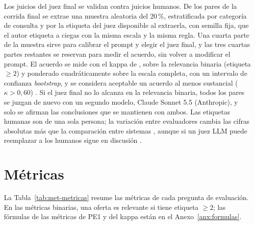 Los juicios del juez final se validan contra juicios humanos. De los pares de la corrida final se extrae una muestra aleatoria del 20\,\%, estratificada por categoría de consulta y por la etiqueta del juez disponible al extraerla, con semilla fija, que el autor etiqueta a ciegas con la misma escala y la misma regla. Una cuarta parte de la muestra sirve para calibrar el prompt y elegir el juez final, y las tres cuartas partes restantes se reservan para medir el acuerdo, sin volver a modificar el prompt. El acuerdo se mide con el kappa de \citet{Cohen1960}, sobre la relevancia binaria (etiqueta $\geq 2$) y ponderado cuadráticamente sobre la escala completa, con un intervalo de confianza \textit{bootstrap}, y se considera aceptable un acuerdo al menos sustancial ($\kappa > 0{,}60$) \citep{Landis1977}. Si el juez final no lo alcanza en la relevancia binaria, todos los pares se juzgan de nuevo con un segundo modelo, Claude Sonnet 5.5 (Anthropic), y solo se afirman las conclusiones que se mantienen con ambos. Las etiquetas humanas son de una sola persona; la variación entre evaluadores cambia las cifras absolutas más que la comparación entre sistemas \citep{Voorhees2000}, aunque si un juez LLM puede reemplazar a los humanos sigue en discusión \citep{Soboroff2025,ClarkeDietz2024}.

\section{Métricas}
\label{sec:met-metricas}

La Tabla~\ref{tab:met-metricas} resume las métricas de cada pregunta de evaluación. En las métricas binarias, una oferta es relevante si tiene etiqueta $\geq 2$; las fórmulas de las métricas de PE1 y del kappa están en el Anexo~\ref{anx:formulas}.


